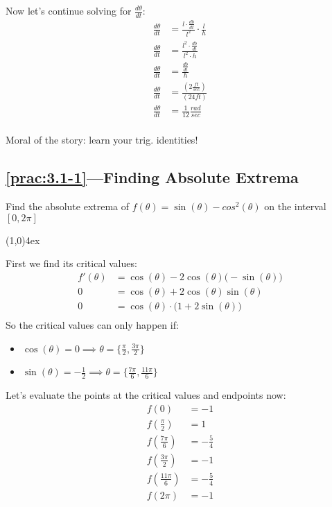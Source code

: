 \documentclass{MathNotes}
\newcommand{\br}{
	\begin{center}
		\line(1,0){4ex}
	\end{center}}
\newcommand{\continued}{
	\mbox{}
	\vfill
	\textbf{Continued on Next Page...}\newpage
}
\begin{document}
Now let's continue solving for $\frac{d\theta}{dt}$:
\begin{align*}
	\frac{d\theta}{dt} & =\frac{l\cdot\frac{db}{dt}}{l^2}\cdot\frac{l}{h} \\
	\frac{d\theta}{dt} & =\frac{l^2\cdot\frac{db}{dt}}{l^2\cdot h}        \\
	\frac{d\theta}{dt} & =\frac{\frac{db}{dt}}{h}                         \\
	\frac{d\theta}{dt} & =\frac{(2\frac{ft}{sec})}{(24ft)}                \\
	\frac{d\theta}{dt} & =\frac{1}{12}\frac{rad}{sec}                     \\
\end{align*}

Moral of the story: learn your trig. identities!
\newpage
\subsection*{\ref{prac:3.1-1}---Finding Absolute Extrema}\label{ans:3.1-1}
Find the absolute extrema of $f(\theta)=\sin(\theta)-cos^2(\theta)$ on
the interval $[0, 2\pi]$
\br
First we find its critical values:
\begin{align*}
	f'(\theta) & =\cos(\theta)-2\cos(\theta)\big(-\sin(\theta)\big) \\
	0          & =\cos(\theta)+2\cos(\theta)\sin(\theta)            \\
	0          & =\cos(\theta)\cdot\big(1+2\sin(\theta)\big)        \\
\end{align*}
So the critical values can only happen if:
\begin{multicols}{2}
	\begin{itemize}
		\item $\cos(\theta)=0\implies\theta=\{\frac{\pi}{2}, \frac{3\pi}{2}\}$
		\item $\sin(\theta)=-\frac{1}{2}\implies\theta=\{\frac{7\pi}{6},
			      \frac{11\pi}{6}\}$
	\end{itemize}
\end{multicols}

Let's evaluate the points at the critical values and endpoints now:
\begin{align*}
	f(0)               & =-1           \\
	f(\frac{\pi}{2})   & =1            \\
	f(\frac{7\pi}{6})  & =-\frac{5}{4} \\
	f(\frac{3\pi}{2})  & =-1           \\
	f(\frac{11\pi}{6}) & =-\frac{5}{4} \\
	f(2\pi)            & =-1           \\
\end{align*}
\end{document}
